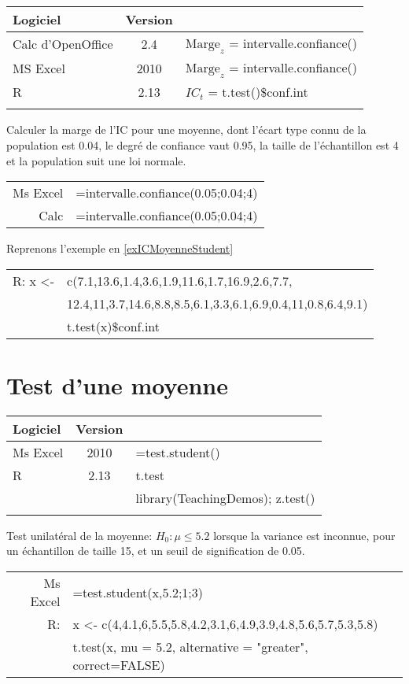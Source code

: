 \begin{tabular}{lc|l}
	Logiciel & Version \\
	\hline
	Calc d'OpenOffice & 2.4 & $\mbox{Marge}_z$ = {\sc intervalle.confiance}()\\
	MS Excel & 2010 & $\mbox{Marge}_z$ = {\sc intervalle.confiance}()\\
	R & 2.13 & $IC_t$ = t.test()\$conf.int\\
\\
\end{tabular}

\begin{ex}
Calculer la marge de l'IC pour une moyenne, dont l'\'ecart type connu de la population est 0.04, le degr\'e de confiance vaut 0.95, la taille de l'\'echantillon est 4 et la population suit une loi normale.\\[5mm]
\begin{tabular}{|rl|}
\hline
	Ms Excel & {\sc =intervalle.confiance(0.05;0.04;4)}\\
	Calc & {\sc =intervalle.confiance(0.05;0.04;4)}\\
\hline
\end{tabular}

\vspace{5mm}
Reprenons l'exemple en \ref{exICMoyenneStudent}\\[5mm]
\begin{tabular}{|rl|}
\hline
	R:  x <- & c(7.1,13.6,1.4,3.6,1.9,11.6,1.7,16.9,2.6,7.7,\\
	         & 12.4,11,3.7,14.6,8.8,8.5,6.1,3.3,6.1,6.9,0.4,11,0.8,6.4,9.1)
\\
 & t.test(x)\$conf.int\\
\hline
\end{tabular}
\end{ex}

\section{Test d'une moyenne}
\begin{tabular}{lc|l}
	Logiciel & Version \\
	\hline
	Ms Excel & 2010 & {\sc =test.student}()\\
	R & 2.13 & t.test\\
	 & & library(TeachingDemos); z.test()\\
\\
\end{tabular}

\begin{ex}
Test unilat\'eral de la moyenne:  $H_0: \mu\leq 5.2$ lorsque la variance est inconnue, pour un \'echantillon de taille 15, et un seuil de signification de 0.05.

\begin{tabular}{|rl|}
\hline
	Ms Excel & {\sc =test.student(x,5.2;1;3)}\\
	R:  & x <- c(4,4.1,6,5.5,5.8,4.2,3.1,6,4.9,3.9,4.8,5.6,5.7,5.3,5.8)\\
	    & t.test(x, mu = 5.2, alternative = "greater", correct=FALSE)\\
\hline
\end{tabular}
\end{ex}


